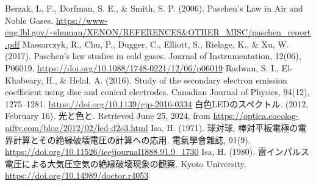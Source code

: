 \documentclass[a4paper]{ltjsarticle}
\begin{document}
\begin{thebibliography}{99}
     Berzak, L. F., Dorfman, S. E., \& Smith, S. P. (2006). Paschen’s Law in Air and Noble Gases. \url{https://www-eng.lbl.gov/~shuman/XENON/REFERENCES&OTHER_MISC/paschen_report.pdf}
     Massarczyk, R., Chu, P., Dugger, C., Elliott, S., Rielage, K., \& Xu, W. (2017). Paschen’s law studies in cold gases. Journal of Instrumentation, 12(06), P06019. \url{https://doi.org/10.1088/1748-0221/12/06/p06019}
     Radwan, S. I., El-Khabeary, H., \& Helal, A. (2016). Study of the secondary electron emission coefficient using disc and conical electrodes. Canadian Journal of Physics, 94(12), 1275–1281. \url{https://doi.org/10.1139/cjp-2016-0334}
     白色LEDのスペクトル. (2012, February 16). 光と色と. Retrieved June 25, 2024, from \url{https://optica.cocolog-nifty.com/blog/2012/02/led-d2e3.html}
     Isa, H. (1971). 球対球, 棒対平板電極の電界計算とその絶縁破壊電圧の計算への応用. 電氣學會雜誌, 91(9). \url{https://doi.org/10.11526/ieejjournal1888.91.9_1730}
     Isa, H. (1980). 雷インパルス電圧による大気圧空気の絶縁破壊現象の観察. Kyoto University. \url{https://doi.org/10.14989/doctor.r4053}
\end{thebibliography}
\end{document}
